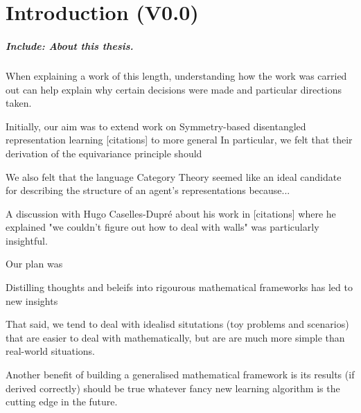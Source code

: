 \chapter{
  Introduction
  (V0.0)
 }




\paragraph{Include: About this thesis.}
When explaining a work of this length, understanding how the work was carried out can help explain why certain decisions were made and particular directions taken.

Initially, our aim was to extend work on Symmetry-based disentangled representation learning [citations] to more general
In particular, we felt that their derivation of the equivariance principle should

We also felt that the language Category Theory seemed like an ideal candidate for describing the structure of an agent's representations because...

A discussion with Hugo Caselles-Dupré about his work in [citations] where he explained "we couldn't figure out how to deal with walls" was particularly insightful.

Our plan was


Distilling thoughts and beleifs into rigourous mathematical frameworks has led to new insights

That said, we tend to deal with idealisd situtations (toy problems and scenarios) that are easier to deal with mathematically, but are are much more simple than real-world situations.

Another benefit of building a generalised mathematical framework is its results (if derived correctly) should be true whatever fancy new learning algorithm is the cutting edge in the future.












